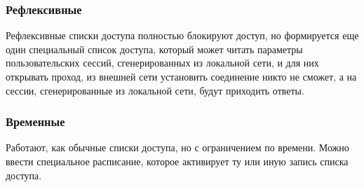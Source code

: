 	\subsubsection*{Рефлексивные}
	Рефлексивные списки доступа полностью блокируют доступ, но формируется еще один специальный список доступа, который может читать параметры пользовательских сессий, сгенерированных из локальной сети, и для них открывать проход, из внешней сети установить соединение никто не сможет, а на сессии, сгенерированные из локальной сети, будут приходить ответы.
	
	\subsubsection*{Временные}
	Работают, как обычные списки доступа, но с ограничением по времени. Можно ввести специальное расписание, которое активирует ту или иную запись списка доступа.

